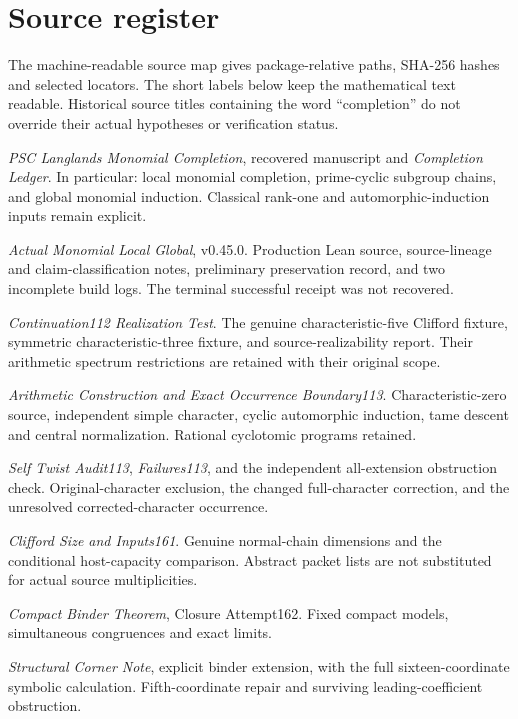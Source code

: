 \documentclass[11pt]{article}
\theoremstyle{definition}\newtheorem{definition}[proposition]{Definition}
\begin{document}
\clearpage
\section*{Source register}
The machine-readable source map gives package-relative paths, SHA-256 hashes and selected locators. The short labels below keep the mathematical text readable. Historical source titles containing the word ``completion'' do not override their actual hypotheses or verification status.

\begin{description}[leftmargin=1.3cm,style=nextline]
\raggedright
\item[M] \emph{PSC Langlands Monomial Completion}, recovered manuscript and \emph{Completion Ledger}. In particular: local monomial completion, prime-cyclic subgroup chains, and global monomial induction. Classical rank-one and automorphic-induction inputs remain explicit.
\item[M45] \emph{Actual Monomial Local Global}, v0.45.0. Production Lean source, source-lineage and claim-classification notes, preliminary preservation record, and two incomplete build logs. The terminal successful receipt was not recovered.
\item[C112] \emph{Continuation112 Realization Test}. The genuine characteristic-five Clifford fixture, symmetric characteristic-three fixture, and source-realizability report. Their arithmetic spectrum restrictions are retained with their original scope.
\item[C113] \emph{Arithmetic Construction and Exact Occurrence Boundary113}. Characteristic-zero source, independent simple character, cyclic automorphic induction, tame descent and central normalization. Rational cyclotomic programs retained.
\item[C113-S] \emph{Self Twist Audit113}, \emph{Failures113}, and the independent all-extension obstruction check. Original-character exclusion, the changed full-character correction, and the unresolved corrected-character occurrence.
\item[C161] \emph{Clifford Size and Inputs161}. Genuine normal-chain dimensions and the conditional host-capacity comparison. Abstract packet lists are not substituted for actual source multiplicities.
\item[B162] \emph{Compact Binder Theorem}, Closure Attempt162. Fixed compact models, simultaneous congruences and exact limits.
\item[Corner] \emph{Structural Corner Note}, explicit binder extension, with the full sixteen-coordinate symbolic calculation. Fifth-coordinate repair and surviving leading-coefficient obstruction.

\end{description}
\end{document}
